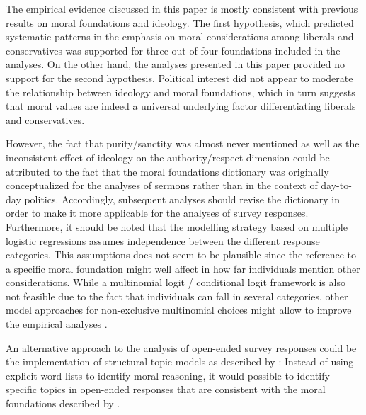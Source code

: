 \documentclass[12pt]{article}
\begin{document}
The empirical evidence discussed in this paper is mostly consistent with previous results on moral foundations and ideology. The first hypothesis, which predicted systematic patterns in the emphasis on moral considerations among liberals and conservatives was supported for three out of four foundations included in the analyses. On the other hand, the analyses presented in this paper provided no support for the second hypothesis. Political interest did not appear to moderate the relationship between ideology and moral foundations, which in turn suggests that moral values are indeed a universal underlying factor differentiating liberals and conservatives.

However, the fact that purity/sanctity was almost never mentioned as well as the inconsistent effect of ideology on the authority/respect dimension could be attributed to the fact that the moral foundations dictionary was originally conceptualized for the analyses of sermons rather than in the context of day-to-day politics. Accordingly, subsequent analyses should revise the dictionary in order to make it more applicable for the analyses of survey responses. Furthermore, it should be noted that the modelling strategy based on multiple logistic regressions assumes independence between the different response categories. This assumptions does not seem to be plausible since the reference to a specific moral foundation might well affect in how far individuals mention other considerations. While a multinomial logit / conditional logit framework is also not feasible due to the fact that individuals can fall in several categories, other model approaches for non-exclusive multinomial choices might allow to improve the empirical analyses \citep[see for example][]{gilbert2007models}.

An alternative approach to the analysis of open-ended survey responses could be the implementation of structural topic models as described by \citet{roberts2014structural}: Instead of using explicit word lists to identify moral reasoning, it would possible to identify specific topics in open-ended responses that are consistent with the moral foundations described by \citet{haidt2008moral} \citep[see also][]{lin2008joint}.
\end{document}
